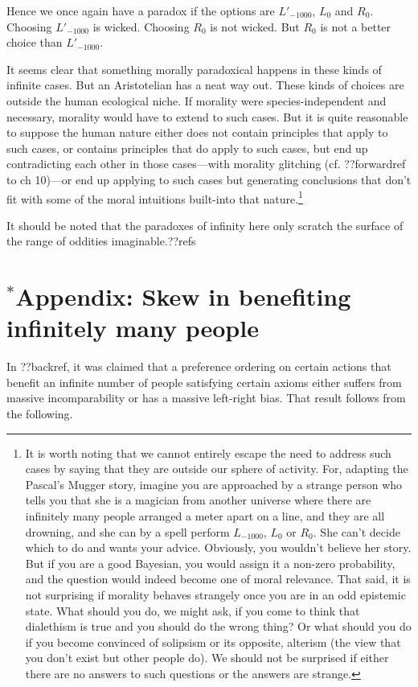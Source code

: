 Hence we once again have a paradox if the options are $L'_{-1000}$, $L_0$ and $R_0$. Choosing $L'_{-1000}$ is wicked.
Choosing $R_0$ is not wicked. But $R_0$ is not a better choice than $L'_{-1000}$.

It seems clear that something morally paradoxical happens in these kinds of infinite cases. But an 
Aristotelian has a neat way out. These kinds of choices are outside the human ecological niche. If 
morality were species-independent and necessary, morality would have to extend to such cases. But 
it is quite reasonable to suppose the human nature either does not contain principles that apply to 
such cases, or contains principles that do apply to such cases, but end up contradicting each other 
in those cases---with morality glitching (cf. ??forwardref to ch 10)---or end up applying to such 
cases but generating conclusions that don't fit with some of the moral intuitions built-into that 
nature.\footnote{It is worth noting that we cannot entirely escape the need to address such cases
by saying that they are outside our sphere of activity. For, adapting the Pascal's Mugger story, 
imagine you are approached by a strange person who tells you that she is a magician from another
universe where there are infinitely many people arranged a meter apart on a line, and they are all
drowning, and she can by a spell perform $L_{-1000}$, $L_0$ or $R_0$. She can't decide which to do 
and wants your advice. Obviously, you wouldn't believe her story. But if you are a good Bayesian,
you would assign it a non-zero probability, and the question would indeed become one of moral 
relevance. That said, it is not surprising if morality behaves strangely once you are in an odd 
epistemic state. What should you do, we might ask, if you come to think that dialethism is true and 
you should do the wrong thing? Or what should you do if you become convinced of solipsism or its 
opposite, alterism (the view that you don't exist but other people do). We should not be surprised if 
either there are no answers to such questions or the answers are strange.}

It should be noted that the paradoxes of infinity here only scratch the surface of the range of 
oddities imaginable.??refs

\section*{$^*$Appendix: Skew in benefiting infinitely many people} 
In ??backref, it was claimed that a preference ordering on certain actions 
that benefit an infinite number of people satisfying certain axioms either
suffers from massive incomparability or has a massive left-right bias.
That result follows from the following.

